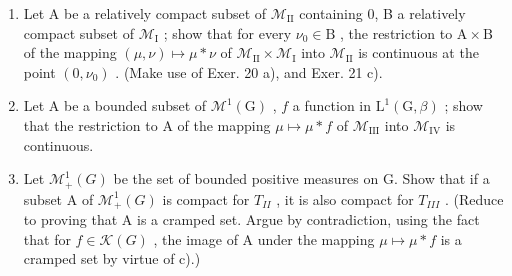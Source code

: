 \begin{enumerate}
  Let A be a relatively compact subset of \(\mathcal{M}_{\mathrm{II}}\) , B a subset of \(\mathrm{L}^1 (\mathrm{G},\beta)\) , relatively compact for the topology of the norm \(\| f\| _1\) . Show that the restriction to \(\mathbf{A}\times \mathbf{B}\) of the mapping \((\mu ,f)\mapsto \mu *\textit{f}\) of \(\mathcal{M}_{\mathrm{III}}\times \mathrm{L}^1 (\mathrm{G},\beta)\) into \(\mathrm{L}^1 (\mathrm{G},\beta)\) is continuous (L \(^1 (\mathrm{G},\beta)\) being equipped with its normed space topology). (Reduce to proving that for \(f\in \mathcal{K}(\mathrm{G})\) , the mapping \(\mu \mapsto \mu *\textit{f}\) of \(\mathcal{M}_{\mathrm{II}}\) into \(\mathrm{L}^1 (\mathrm{G},\beta)\) is continuous in A. Using the fact that for \(g\in \mathrm{L}^{\infty}(\mathrm{G},\beta)\) and \(f\in \mathcal{K}(\mathrm{G})\) , \(g*\textit{f}\) is uniformly continuous for the left uniform structure, first show that the mapping \(\mu \mapsto \mu *\textit{f}\) of \(\mathcal{M}_{\mathrm{II}}\) into \(\mathcal{M}_{\mathrm{IV}}\) is continuous. Next, using Exer. 20 a), reduce to proving that if C is a subset of \(\mathrm{L}^1 (\mathrm{G},\beta)\) compact for the topology \(\sigma (\mathrm{L}^{1}(\mathrm{G},\beta),\mathrm{L}^{\infty}(\mathrm{G},\beta))\) and \(h\in \mathcal{K}(\mathbf{G})\) , the mapping \(\mu \mapsto \mu *h\) of C into \(\mathrm{L}^1 (\mathrm{G},\beta)\) is continuous when \(\mathrm{L}^1 (\mathrm{G},\beta)\) is equipped with its normed space topology. By the same reasoning as in \(a\) ), show that for this it suffices to prove that the image of C under this mapping is compact for the normed space topology. To this end, use Šmulian's theorem, the fact that C is cramped (§3, Exer. 10) and Lebesgue's theorem.)
\item
  Let A be a relatively compact subset of \(\mathcal{M}_{\mathrm{II}}\) containing 0, B a relatively compact subset of \(\mathcal{M}_{\mathrm{I}}\) ; show that for every \(\nu_0 \in \mathrm{B}\) , the restriction to \(\mathrm{A} \times \mathrm{B}\) of the mapping \((\mu, \nu) \mapsto \mu * \nu\) of \(\mathcal{M}_{\mathrm{II}} \times \mathcal{M}_{\mathrm{I}}\) into \(\mathcal{M}_{\mathrm{II}}\) is continuous at the point \((0, \nu_0)\) . (Make use of Exer. 20 a), and Exer. 21 c).
\item
  Let A be a bounded subset of \(\mathcal{M}^1 (\mathrm{G})\) , \(f\) a function in \(\mathrm{L}^1 (\mathrm{G},\beta)\) ; show that the restriction to A of the mapping \(\mu \mapsto \mu *f\) of \(\mathcal{M}_{\mathrm{III}}\) into \(\mathcal{M}_{\mathrm{IV}}\) is continuous.
\item
  Let \(\mathcal{M}_{+}^{1}(G)\) be the set of bounded positive measures on G. Show that if a subset A of \(\mathcal{M}_{+}^{1}(G)\) is compact for \(T_{II}\) , it is also compact for \(T_{III}\) . (Reduce to proving that A is a cramped set. Argue by contradiction, using the fact that for \(f \in \mathcal{K}(G)\) , the image of A under the mapping \(\mu \mapsto \mu * f\) is a cramped set by virtue of c).)
\end{enumerate}

